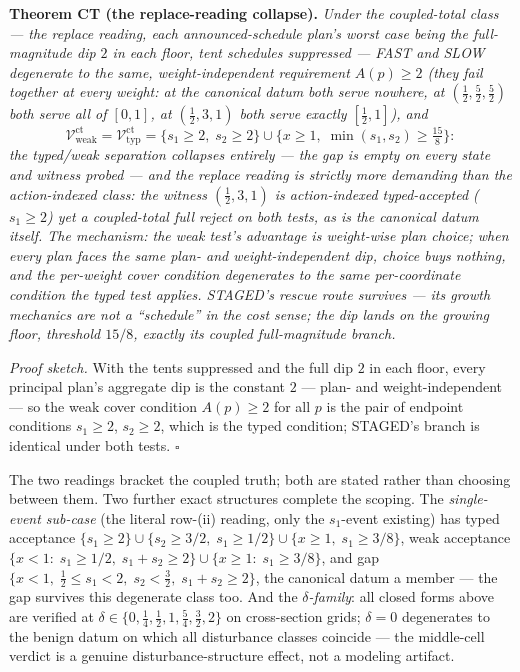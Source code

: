 \documentclass[3p,11pt]{elsarticle}
\begin{document}
\textbf{Theorem CT (the replace-reading collapse).} \emph{Under the
coupled-total class --- the replace reading, each announced-schedule
plan's worst case being the full-magnitude dip \(2\) in each floor,
tent schedules suppressed --- FAST and SLOW degenerate to the same,
weight-independent requirement \(A(p) \ge 2\) (they fail together at
every weight: at the canonical datum both serve nowhere, at
\((\tfrac12, \tfrac52, \tfrac52)\) both serve all of \([0,1]\),
at \((\tfrac12, 3, 1)\) both serve exactly \([\tfrac12, 1]\)),
and}
\[
\mathcal{V}_{\mathrm{weak}}^{\mathrm{ct}} =
\mathcal{V}_{\mathrm{typ}}^{\mathrm{ct}}
= \{ s_1 \ge 2,\; s_2 \ge 2 \} \cup \{ x \ge 1,\; \min(s_1, s_2) \ge
\tfrac{15}{8} \}:
\]
\emph{the typed/weak separation collapses entirely --- the gap is empty
on every state and witness probed --- and the replace reading is
strictly more demanding than the action-indexed class: the witness
\((\tfrac12, 3, 1)\) is action-indexed typed-accepted (\(s_1 \ge
2\)) yet a coupled-total full reject on both tests, as is the canonical
datum itself. The mechanism: the weak test's advantage is weight-wise
plan choice; when every plan faces the same plan- and
weight-independent dip, choice buys nothing, and the per-weight cover
condition degenerates to the same per-coordinate condition the typed
test applies. STAGED's rescue route survives --- its growth mechanics
are not a ``schedule'' in the cost sense; the dip lands on the growing
floor, threshold \(15/8\), exactly its coupled full-magnitude
branch.}

\emph{Proof sketch.} With the tents suppressed and the full dip \(2\)
in each floor, every principal plan's aggregate dip is the constant
\(2\) --- plan- and weight-independent --- so the weak cover condition
\(A(p) \ge 2\) for all \(p\) is the pair of endpoint conditions
\(s_1 \ge 2\), \(s_2 \ge 2\), which is the typed condition;
STAGED's branch is identical under both tests. \ensuremath{\square}

\medskip

\noindent The two readings bracket the coupled truth; both are stated
rather than choosing between them. Two further exact structures complete
the scoping. The \emph{single-event sub-case} (the literal row-(ii)
reading, only the \(s_1\)-event existing) has typed acceptance \(\{
s_1 \ge 2 \} \cup \{ s_2 \ge 3/2,\; s_1 \ge 1/2 \} \cup \{ x
\ge 1,\; s_1 \ge 3/8 \}\), weak acceptance \(\{ x < 1:\; s_1 \ge
1/2,\; s_1 + s_2 \ge 2 \} \cup \{ x \ge 1:\; s_1 \ge 3/8 \}\),
and gap \(\{ x < 1,\; \tfrac12 \le s_1 < 2,\; s_2 < \tfrac32,\;
s_1 + s_2 \ge 2 \}\), the canonical datum a member --- the gap
survives this degenerate class too. And the \emph{\(\delta\)-family}:
all closed forms above are verified at \(\delta \in \{0,
\tfrac14, \tfrac12, 1, \tfrac54, \tfrac32, 2\}\) on cross-section
grids; \(\delta = 0\) degenerates to the benign datum on which all
disturbance classes coincide --- the middle-cell verdict is a genuine
disturbance-structure effect, not a modeling artifact.
\end{document}
